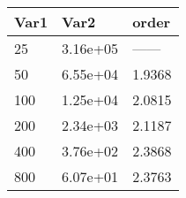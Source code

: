 \begin{tabular}{lll}
Var1 & Var2 & order \\ 
\hline 
25 & 3.16e+05 & ------ \\ 
50 & 6.55e+04 & 1.9368 \\ 
100 & 1.25e+04 & 2.0815 \\ 
200 & 2.34e+03 & 2.1187 \\ 
400 & 3.76e+02 & 2.3868 \\ 
800 & 6.07e+01 & 2.3763 \\ 
\hline 
\end{tabular}